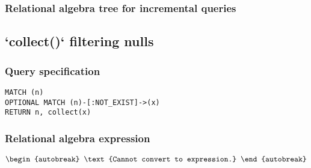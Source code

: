 \subsubsection*{Relational algebra tree for incremental queries}


\subsection{`collect()` filtering nulls}

\subsubsection*{Query specification}

\begin{lstlisting}
MATCH (n)
OPTIONAL MATCH (n)-[:NOT_EXIST]->(x)
RETURN n, collect(x)
\end{lstlisting}

\subsubsection*{Relational algebra expression}

\begin{align*}
\begin{autobreak}
\text{Cannot convert to expression.}
\end{autobreak}
\end{align*}

